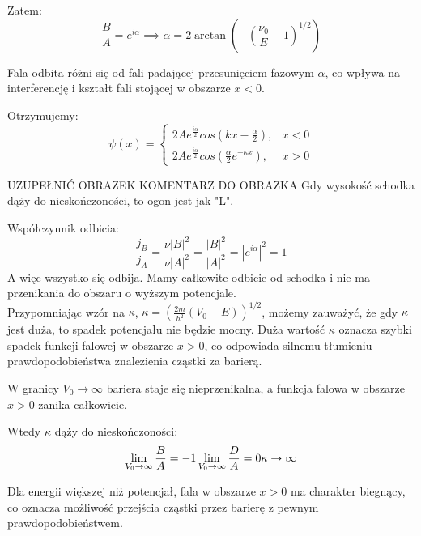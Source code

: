 Zatem:
\begin{equation*}
\frac{B}{A} = e^{i \alpha} \implies \alpha =2 \arctan \left( - \left(  \frac{\nu_0}{E} - 1 \right) ^{1/2} \right)
\end{equation*}

Fala odbita różni się od fali padającej przesunięciem fazowym $\alpha$, co wpływa na interferencję i kształt fali stojącej w obszarze $x<0$.

Otrzymujemy:
\begin{equation*}
\psi(x) = 
\begin{cases}
    2 A e^{\frac{i \alpha}{2}} cos(kx - \frac{\alpha}{2}), & x < 0 \\
    2 A e^{\frac{i \alpha}{2}} cos(\frac{\alpha}{2} e^{-\kappa x}), & x > 0
\end{cases}
\end{equation*}

{{ UZUPEŁNIĆ OBRAZEK }}
{{ KOMENTARZ DO OBRAZKA }} Gdy wysokość schodka dąży do nieskończoności, to ogon jest jak "L".

Współczynnik odbicia:
\begin{equation*}
\frac{j_B}{j_A} = \frac{\nu \left| B \right|^2}{\nu \left| A \right|^2} = \frac{\left| B \right|^2}{\left| A \right|^2} = \left| e^{i \alpha} \right|^2 = 1
\end{equation*}
A więc wszystko się odbija. Mamy całkowite odbicie od schodka i nie ma przenikania do obszaru o wyższym potencjale. \\

Przypomniając wzór na $\kappa$, $\kappa = \left( \frac{2m}{h^2} (V_0 - E) \right)^{1/2}$, możemy zauważyć, że gdy $\kappa$ jest duża,
to spadek potencjału nie będzie mocny. Duża wartość $\kappa$ oznacza szybki spadek funkcji falowej w obszarze $x>0$,
co odpowiada silnemu tłumieniu prawdopodobieństwa znalezienia cząstki za barierą.


W granicy $V_0 \to \infty$ bariera staje się nieprzenikalna, a funkcja falowa w obszarze $x>0$ zanika całkowicie.

Wtedy $\kappa$ dąży do nieskończoności:
\begin{equation*}
    \lim_{V_0 \to \infty} \frac{B}{A} = -1 \\
    \lim_{V_0 \to \infty} \frac{D}{A} = 0 \\
    \kappa \to \infty
\end{equation*}

Dla energii większej niż potencjał, fala w obszarze $x>0$ ma charakter biegnący,
co oznacza możliwość przejścia cząstki przez barierę z pewnym prawdopodobieństwem.

